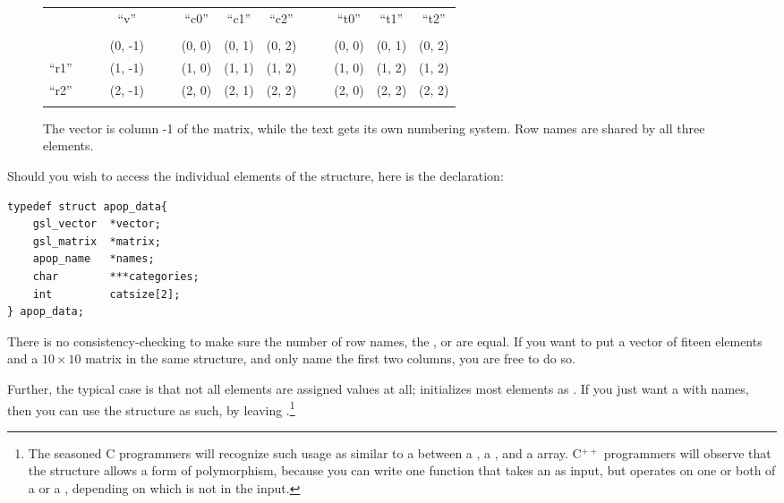 \def\atouch{\phantom {.}}
\renewcommand\arraystretch{1.1}
\begin{figure}
\hspace {-0.5cm}
\begin{tabular}{lc|ccc|ccccc|cccc}
\hhline{~~~-~~---~~---}
        &&& \multicolumn{1}{|c|}{``v''}   &&& \multicolumn{1}{|c}{``c0''} & ``c1'' & \multicolumn{1}{c|}{``c2''}  &&& \multicolumn{1}{|c}{``t0''} & ``t1'' & \multicolumn{1}{c|}{``t2''}    \\\hhline{~~~-~~---~~---}
\atouch&\atouch&\atouch&\atouch&\atouch&\atouch&\atouch&\atouch&\atouch&\atouch&\atouch&\atouch&\atouch\\\hhline{-}
\multicolumn{1}{|c|}{``r0''}&&&(0, -1)   &&& (0, 0) & (0, 1) & (0, 2) &&& (0, 0) & (0, 1) & (0, 2)\\ 
\multicolumn{1}{|c|}{``r1''}&&&(1, -1)   &&& (1, 0) & (1, 1) & (1, 2) &&& (1, 0) & (1, 2) & (1, 2)\\
\multicolumn{1}{|c|}{``r2''}&\atouch&\atouch&(2, -1)   &\atouch&& (2, 0) & (2, 1) & (2, 2) &\atouch&\atouch& (2, 0) & (2, 2) & (2, 2)\\\hhline{-}
\end{tabular}
\caption{The vector is column -1 of the matrix, while the text gets its
own numbering system. Row names are shared by all three
elements.}
\label{datalayout}
\end{figure}

Should you wish to access the individual elements of the  structure, here is the declaration:

\begin{lstlisting}
typedef struct apop_data{
    gsl_vector  *vector;
    gsl_matrix  *matrix;
    apop_name   *names;
    char        ***categories;
    int         catsize[2];
} apop_data;
\end{lstlisting}


There is no consistency-checking to make sure the number of row names,
the , or   are equal.
If you want to put a vector of fiteen elements and a $10 \times 10$
matrix in the same structure, and only name the first two columns, you
are free to do so.

Further, the typical case is that not all elements are assigned 
values at all;  initializes most elements as
. If you just want a  with
names, then you can use the  structure as such,
by leaving 
.\footnote{The seasoned C programmers will recognize such usage as 
similar to a  between a , a
, and a  array. C$^{++}$ programmers
will observe that the structure allows a form of polymorphism, because
you can write one function that takes an 
as input, but operates on one or both of a  or a
, depending on which is not  in
the input.}

